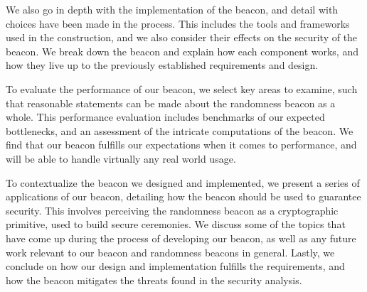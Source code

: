 We also go in depth with the implementation of the beacon, and detail with choices have been made in the process.
This includes the tools and frameworks used in the construction, and we also consider their effects on the security of the beacon.
We break down the beacon and explain how each component works, and how they live up to the previously established requirements and design.

\bigskip\noindent
To evaluate the performance of our beacon, we select key areas to examine, such that reasonable statements can be made about the randomness beacon as a whole.
This performance evaluation includes benchmarks of our expected bottlenecks, and an assessment of the intricate computations of the beacon.
We find that our beacon fulfills our expectations when it comes to performance, and will be able to handle virtually any real world usage.

To contextualize the beacon we designed and implemented, we present a series of applications of our beacon, detailing how the beacon should be used to guarantee security.
This involves perceiving the randomness beacon as a cryptographic primitive, used to build secure ceremonies.
We discuss some of the topics that have come up during the process of developing our beacon, as well as any future work relevant to our beacon and randomness beacons in general.
Lastly, we conclude on how our design and implementation fulfills the requirements, and how the beacon mitigates the threats found in the security analysis.

